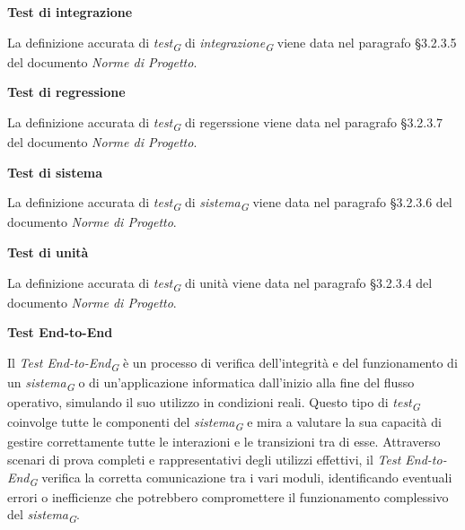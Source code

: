 \documentclass{article}
\begin{document}
\textbf{Test di integrazione}

\vspace{0.1cm}

La definizione accurata di \textit{test}\textsubscript{\textit{G}} di \textit{integrazione}\textsubscript{\textit{G}} viene data nel paragrafo §3.2.3.5 del documento \textit{Norme di Progetto}.

\vspace{0.4cm}

\textbf{Test di regressione}

\vspace{0.1cm}

La definizione accurata di \textit{test}\textsubscript{\textit{G}} di regerssione viene data nel paragrafo §3.2.3.7 del documento \textit{Norme di Progetto}.

\vspace{0.4cm}

\textbf{Test di sistema} 

\vspace{0.1cm}

La definizione accurata di \textit{test}\textsubscript{\textit{G}} di \textit{sistema}\textsubscript{\textit{G}} viene data nel paragrafo §3.2.3.6 del documento \textit{Norme di Progetto}.

\vspace{0.4cm}

\textbf{Test di unità}

\vspace{0.1cm}

La definizione accurata di \textit{test}\textsubscript{\textit{G}} di unità viene data nel paragrafo §3.2.3.4 del documento \textit{Norme di Progetto}.

\vspace{0.4cm}

\textbf{Test End-to-End}

\vspace{0.1cm}

Il \textit{Test End-to-End}\textsubscript{\textit{G}} è un processo di verifica dell'integrità e del funzionamento di un \textit{sistema}\textsubscript{\textit{G}} o di un'applicazione informatica dall'inizio alla fine del flusso operativo, simulando il suo utilizzo in condizioni reali. Questo tipo di \textit{test}\textsubscript{\textit{G}} coinvolge tutte le componenti del \textit{sistema}\textsubscript{\textit{G}} e mira a valutare la sua capacità di gestire correttamente tutte le interazioni e le transizioni tra di esse. Attraverso scenari di prova completi e rappresentativi degli utilizzi effettivi, il \textit{Test End-to-End}\textsubscript{\textit{G}} verifica la corretta comunicazione tra i vari moduli, identificando eventuali errori o inefficienze che potrebbero compromettere il funzionamento complessivo del \textit{sistema}\textsubscript{\textit{G}}.
\end{document}
